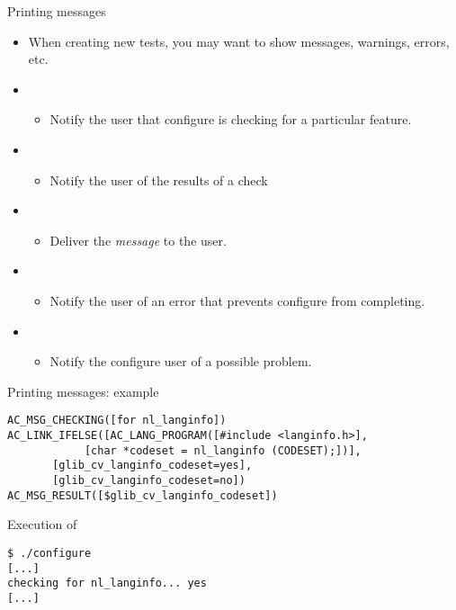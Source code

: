 \begin{frame}{Printing messages}
  \begin{itemize}
  \item When creating new tests, you may want to show messages,
    warnings, errors, etc.
  \item {}
    \begin{itemize}
    \item Notify the user that configure is checking for a
      particular feature.
    \end{itemize}
  \item {}
    \begin{itemize}
    \item Notify the user of the results of a check
    \end{itemize}
  \item {}
    \begin{itemize}
    \item Deliver the {\em message} to the user.
    \end{itemize}
  \item {}
    \begin{itemize}
    \item Notify the user of an error that prevents configure from
      completing.
    \end{itemize}
  \item {}
    \begin{itemize}
    \item Notify the configure user of a possible problem.
    \end{itemize}
  \end{itemize}
\end{frame}

\begin{frame}[fragile]{Printing messages: example}

\begin{block}{}
\begin{verbatim}
AC_MSG_CHECKING([for nl_langinfo])
AC_LINK_IFELSE([AC_LANG_PROGRAM([#include <langinfo.h>],
            [char *codeset = nl_langinfo (CODESET);])],
       [glib_cv_langinfo_codeset=yes],
       [glib_cv_langinfo_codeset=no])
AC_MSG_RESULT([$glib_cv_langinfo_codeset])
\end{verbatim}
\end{block}

\begin{block}{Execution of }
\begin{verbatim}
$ ./configure
[...]
checking for nl_langinfo... yes
[...]
\end{verbatim}
\end{block}

\end{frame}

